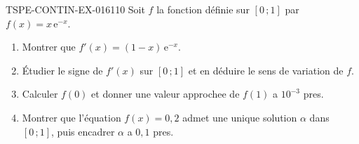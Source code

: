 \begin{exercice}{TSPE-CONTIN-EX-016}{1}{10}
Soit $f$ la fonction définie sur $[0\,;1]$ par $f(x) = x\,\mathrm{e}^{-x}$.
\begin{enumerate}
  \item Montrer que $f'(x) = (1-x)\,\mathrm{e}^{-x}$.
  \item Étudier le signe de $f'(x)$ sur $[0\,;1]$ et en déduire le sens de variation de $f$.
  \item Calculer $f(0)$ et donner une valeur approchee de $f(1)$ a $10^{-3}$ pres.
  \item Montrer que l'équation $f(x) = 0{,}2$ admet une unique solution $\alpha$ dans $[0\,;1]$, puis encadrer $\alpha$ a $0{,}1$ pres.
\end{enumerate}
\end{exercice}
